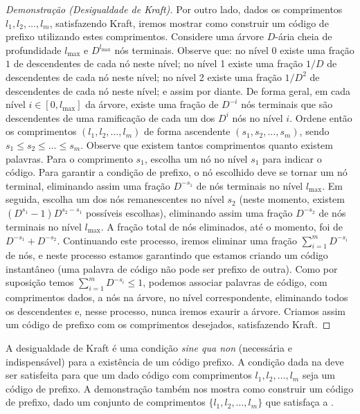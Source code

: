 \begin{proof}[Demonstração (Desigualdade de Kraft)]
Por outro lado, dados os comprimentos $l_1, l_2, \ldots, l_m$, satisfazendo Kraft, iremos mostrar como
construir um código de prefixo utilizando estes comprimentos.
Considere uma árvore $D$-ária cheia de profundidade $l_{\text{max}}$ e $D^{l_{\text{max}}}$ nós terminais.
Observe que: no nível 0 existe uma fração $1$ de descendentes de cada nó neste nível;
no nível 1 existe uma fração $1/D$ de descendentes de cada nó neste nível;
no nível 2 existe uma fração $1/D^2$ de descendentes de cada nó neste nível; e assim por diante.
De forma geral, em cada nível $i \in [0, l_{\text{max}}]$ da árvore, existe uma fração de $D^{-i}$
nós terminais que são descendentes de uma ramificação de cada um dos $D^i$ nós no nível $i$.
Ordene então os comprimentos $(l_1, l_2, \ldots, l_m)$ de forma ascendente $(s_1, s_2, \ldots, s_m)$,
sendo $s_1 \leq s_2 \leq \ldots \leq s_m$. Observe que existem tantos comprimentos quanto existem palavras.
Para o comprimento $s_1$, escolha um nó no nível $s_1$ para indicar o código.
Para garantir a condição de prefixo, o nó escolhido deve se tornar um nó terminal, eliminando assim uma
fração $D^{-s_1}$ de nós terminais no nível $l_{\text{max}}$.
Em seguida, escolha um dos nós remanescentes no nível $s_2$ (neste momento, existem $(D^{s_1}-1)D^{s_2-s_1}$
possíveis escolhas), eliminando assim uma fração $D^{-s_2}$ de nós terminais no nível $l_{\text{max}}$.
A fração total de nós eliminados, até o momento, foi de $D^{-s_1} + D^{-s_2}$.
Continuando este processo, iremos eliminar uma fração $\sum_{i=1}^{m} D^{-s_i}$ de nós, e neste processo
estamos garantindo que estamos criando um código instantâneo (uma palavra de código não pode ser prefixo de outra).
Como por suposição temos $\sum_{i=1}^{m} D^{-s_i} \leq 1$, podemos associar palavras de código,
com comprimentos dados, a nós na árvore, no nível correspondente, eliminando todos os descendentes e, nesse
processo, nunca iremos exaurir a árvore.
Criamos assim um código de prefixo com os comprimentos desejados, satisfazendo Kraft.
\end{proof}

A desigualdade de Kraft é uma condição \emph{sine qua non} (necessária e
indispensável) para a existência de um código prefixo.  A condição dada na
 deve ser satisfeita para que um dado código com
comprimentos $l_1, l_2, \ldots, l_m$ seja um código de prefixo.  A demonstração
também nos mostra como construir um código de prefixo, dado um conjunto de
comprimentos $\{l_1, l_2, \ldots, l_m\}$ que satisfaça a
.





